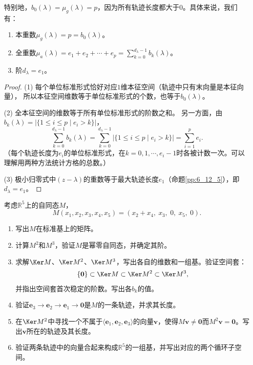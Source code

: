 \documentclass[12pt,UTF8,fontset=none]{ctexbook}
\begin{document}
特别地，$b_0(\lambda) = \mu_g(\lambda) = p$，因为所有轨迹长度都大于$0$。具体来说，我们有：
\begin{enumerate}
\item 本重数$\mu_g(\lambda) = p = b_0(\lambda)$。
\item 全重数$\mu_a(\lambda) = e_1 + e_2 + \cdots + e_p = \sum_{k=0}^{d_\lambda - 1} b_k(\lambda)$。
\item 阶$d_\lambda = e_1$。
\end{enumerate}
\begin{proof}
(1) 每个单位标准形式恰好对应$1$维本征空间（轨迹中只有末向量是本征向量），
所以本征空间维数等于单位标准形式的个数，也等于$b_0(\lambda)$。

(2) 全本征空间的维数等于所有单位标准形式的阶数之和。
另一方面，由$b_k(\lambda) = \left|\{1\leqslant i \leqslant p\mid e_i > k\}\right|$，
$$ \sum_{k=0}^{d_\lambda - 1} b_k(\lambda) = \sum_{k=0}^{d_\lambda - 1} \left|\{1\leqslant i \leqslant p\mid e_i > k\}\right| = \sum_{i=1}^p e_i. $$
（每个轨迹长度为$e_i$的单位标准形式，在$k = 0, 1, \cdots, e_i - 1$时各被计数一次。可以理解用两种方法统计方格的总数。）

(3) 极小归零式中$(z - \lambda)$的重数等于最大轨迹长度$e_1$（命题\ref{pp:6_12_5}），即$d_\lambda = e_1$。
\end{proof}

\begin{et}\label{et:6_nilpotent}
考虑$\mathbb{R}^5$上的自同态$M$，
$$M(x_1, x_2, x_3, x_4, x_5) = (x_2 + x_4,\; x_3,\; 0,\; x_5,\; 0).$$
\begin{enumerate}
\item 写出$M$在标准基上的矩阵。
\item 计算$M^2$和$M^3$，验证$M$是幂零自同态，并确定其阶。
\item 求解$\Ker M$、$\Ker M^2$、$\Ker M^3$，写出各自的维数和一组基。验证空间套：
$$\{\mathbf{0}\} \subset \Ker M \subset \Ker M^2 \subset \Ker M^3,$$
并指出空间套首次稳定的阶数。写出各$b_k$的值。
\item 验证$\mathbf{e}_3 \to \mathbf{e}_2 \to \mathbf{e}_1 \to \mathbf{0}$是$M$的一条轨迹，并求其长度。
\item 在$\Ker M^2$中寻找一个不属于$\langle \mathbf{e}_1, \mathbf{e}_2, \mathbf{e}_3\rangle$的向量$\mathbf{v}$，使得$M\mathbf{v} \neq \mathbf{0}$而$M^2\mathbf{v} = \mathbf{0}$。写出$\mathbf{v}$所在的轨迹及其长度。
\item 验证两条轨迹中的向量合起来构成$\mathbb{R}^5$的一组基，并写出对应的两个循环子空间。
\end{enumerate}
\end{et}
\end{document}
